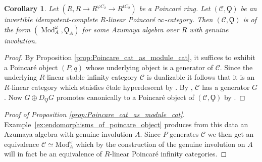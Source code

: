 \documentclass{article}
\DeclareMathOperator{\Mod}{Mod} %
\newtheorem{corollary}[equation]{Corollary}
\theoremstyle{definition}
\newcommand{\Lucy}[1]{\todo[color=cyan]{\linespread{1}\footnotesize L: #1}}
\begin{document}
\begin{corollary}
    Let $ (R, R \to R^{\varphi C_2} \to R^{tC_2}) $ be a Poincaré ring.  
    Let $ \left(\mathcal{C}, \Qoppa\right) $ be an invertible idempotent-complete $ R $-linear Poincaré $ \infty $-category. 
    Then $ \left(\mathcal{C}, \Qoppa\right) $ is of the form $ \left(\Mod^\omega_A, \Qoppa_A \right) $ for some Azumaya algebra over $ R $ with genuine involution.      
\end{corollary}
\begin{proof}
    By Proposition \ref{prop:Poincare_cat_as_module_cat}, it suffices to exhibit a Poincaré object $ (P, q) $ whose underlying object is a generator of $ \mathcal{C} $. Since the underlying $R$-linear stable infinity category $\mathcal{C}$ is dualizable it follows that it is an $R$-linear category which staisfies {\'e}tale hyperdescent by \cite[Example 4.4]{Antieau_Gepner_Bruaer}.
    By \cite[Theorem 6.1]{MR3190610}, $ \mathcal{C} $ has a generator $ G $. 
    Now $ G \oplus D_{\Qoppa}G $ promotes canonically to a Poincaré object of $ \left(\mathcal{C}, \Qoppa\right) $ by \cite[Proposition 2.2.5]{CDHHLMNNSI}. 
\end{proof}
\begin{proof}[Proof of Proposition \ref{prop:Poincare_cat_as_module_cat}]
    Example~\ref{ex:endomorphisms_of_poincare_object} produces from this data an Azumaya algebra with genuine involution $A$. Since $P$ generates $\mathcal{C}$ we then get an equivalence $\mathcal{C}\simeq \mathrm{Mod}_A^\omega$ which by the construction of the genuine involution on $A$ will in fact be an equivalence of $R$-linear Poincar{\'e} infinity categories.
\end{proof}
\end{document}
